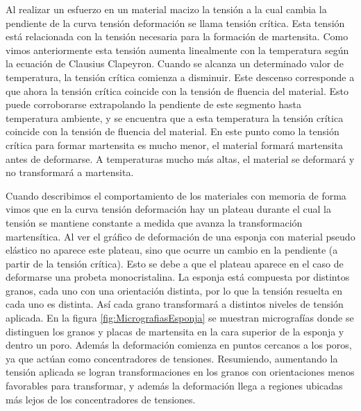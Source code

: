 \documentclass[a4paper,12pt,fleqn,twoside,openany]{book}
\begin{document}
Al realizar un esfuerzo en un material macizo la tensión a la cual cambia la pendiente de la curva tensión deformación se llama tensión crítica. Esta 
tensión está relacionada con la tensión necesaria para la formación de martensita. Como vimos anteriormente esta tensión aumenta linealmente con la temperatura según la 
ecuación de Clausius Clapeyron. Cuando se alcanza un determinado valor de temperatura, la tensión crítica comienza a disminuir. Este descenso corresponde a que ahora la tensión crítica 
coincide con la tensión de fluencia del material. Esto puede corroborarse extrapolando la pendiente de este segmento hasta temperatura ambiente, y se encuentra que a esta 
temperatura la tensión crítica coincide con la tensión de fluencia del material. En este punto como la tensión crítica para formar martensita es mucho menor, el 
material formará martensita antes de deformarse. A temperaturas mucho más altas, el material se deformará y no transformará a martensita.



Cuando describimos el comportamiento de los materiales con memoria de forma vimos que en la curva tensión deformación hay un plateau durante el cual la tensión se 
mantiene constante a medida que avanza la transformación martensítica. Al ver el gráfico de deformación de una esponja con material pseudo elástico no aparece este plateau, 
sino que ocurre un cambio en la pendiente (a partir de la tensión crítica). Esto se debe a que el plateau aparece en el caso de deformarse una probeta monocristalina. 
La esponja está compuesta por distintos granos, cada uno con una orientación distinta, por lo que la tensión resuelta en cada uno es distinta. Así cada grano transformará 
a distintos niveles de tensión aplicada. En la figura \ref{fig:MicrografiasEsponja} se muestran micrografías donde se distinguen los granos y placas de martensita en la cara superior de la esponja y dentro un poro. Además la deformación comienza en puntos cercanos a los poros, ya que actúan como concentradores de tensiones. Resumiendo, 
aumentando la tensión aplicada se logran transformaciones en los granos con orientaciones menos favorables para transformar, y además la deformación llega a regiones ubicadas más lejos 
de los concentradores de tensiones.
\end{document}

